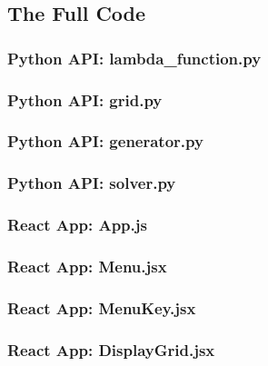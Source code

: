 \documentclass[titlepage]{article}
\begin{document}
\subsection{The Full Code}

\subsubsection{Python API: lambda\_function.py}


\subsubsection{Python API: grid.py}


\subsubsection{Python API: generator.py}


\subsubsection{Python API: solver.py}


\subsubsection{React App: App.js}


\subsubsection{React App: Menu.jsx}


\subsubsection{React App: MenuKey.jsx}


\subsubsection{React App: DisplayGrid.jsx}

\end{document}
